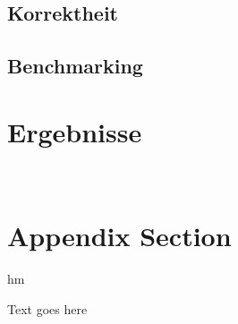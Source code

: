\documentclass[12pt]{article}
\begin{document}
\subsection{Korrektheit}
\subsection{Benchmarking}
\section{Ergebnisse}




\printbibliography


\newpage~\appendix

\section{Appendix Section}

hm 

Text goes here
\end{document}
